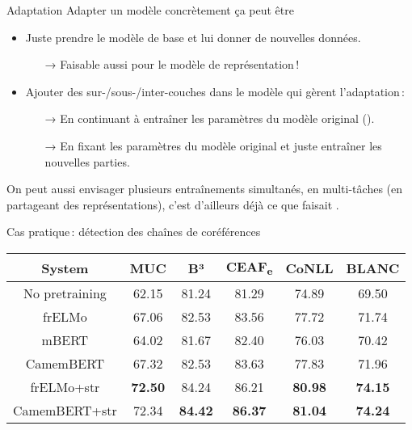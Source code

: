 \documentclass[
	xcolor={svgnames},
	aspectratio=169,
	french,
]{beamer}
\begin{document}
\begin{frame}{Adaptation}
	\alert{Adapter} un modèle concrètement ça peut être

	\pause

	\begin{itemize}[<+->]
		\item Juste prendre le modèle de base et lui donner de nouvelles données.
			\begin{itemize}
				\item[→] Faisable aussi pour le modèle de représentation !
			\end{itemize}
		\item Ajouter des sur-/sous-/inter-couches dans le modèle qui gèrent l'adaptation :
			\begin{itemize}
				\item[→] En continuant à entraîner les paramètres du modèle original
				         ().
				\item[→] En fixant les paramètres du modèle original et juste entraîner les
				         nouvelles parties.
			\end{itemize}
	\end{itemize}

	\pause

	On peut aussi envisager plusieurs entraînements simultanés, en \alert{multi-tâches} (en partageant des représentations), c'est d'ailleurs déjà ce que faisait \textcite{bengio2006NeuralProbabilisticLanguage}.
\end{frame}

\begin{frame}{Cas pratique : détection des chaînes de coréférences}
	\begin{center}
		\begin{tabular}{c*{5}{S}}
			\toprule
			{\textbf{System}}	& {\textbf{MUC}}	& {\textbf{B³}}	& {\textbf{CEAF\textsubscript{e}}}	& {\textbf{CoNLL}}	& {\textbf{BLANC}}\\
			\midrule
			No pretraining & 62.15 & 81.24 & 81.29 & 74.89 & 69.50\\
			frELMo & 67.06 & 82.53 & 83.56 & 77.72 & 71.74\\
			mBERT & 64.02 & 81.67 & 82.40 & 76.03 & 70.42\\
			CamemBERT & 67.32 & 82.53 & 83.63 & 77.83 & 71.96\\
			frELMo+str & \textbf{72.50} & 84.24 & 86.21 & \textbf{80.98} & \textbf{74.15}\\  %
			CamemBERT+str & 72.34 & \textbf{84.42} & \textbf{86.37} & \textbf{81.04} & \textbf{74.24}\\  %
			\bottomrule
		\end{tabular}
	\end{center}
\end{frame}
\end{document}
